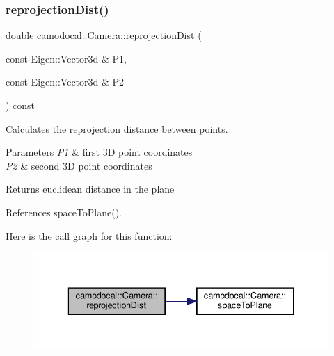 \subsubsection{\texorpdfstring{reprojection\+Dist()}{reprojectionDist()}}
{\footnotesize\ttfamily double camodocal\+::\+Camera\+::reprojection\+Dist (\begin{DoxyParamCaption}\item[{const Eigen\+::\+Vector3d \&}]{P1,  }\item[{const Eigen\+::\+Vector3d \&}]{P2 }\end{DoxyParamCaption}) const}



Calculates the reprojection distance between points. 


\begin{DoxyParams}{Parameters}
{\em P1} & first 3D point coordinates \\
\hline
{\em P2} & second 3D point coordinates \\
\hline
\end{DoxyParams}
\begin{DoxyReturn}{Returns}
euclidean distance in the plane 
\end{DoxyReturn}


References space\+To\+Plane().

Here is the call graph for this function\+:\nopagebreak
\begin{figure}[H]
\begin{center}
\leavevmode
\includegraphics[width=336pt]{classcamodocal_1_1Camera_a544642f8170212af887350cff67d16b5_cgraph}
\end{center}
\end{figure}
\mbox{\label{classcamodocal_1_1Camera_ab162451505d8b9dfda0b96383d597a16}} 
